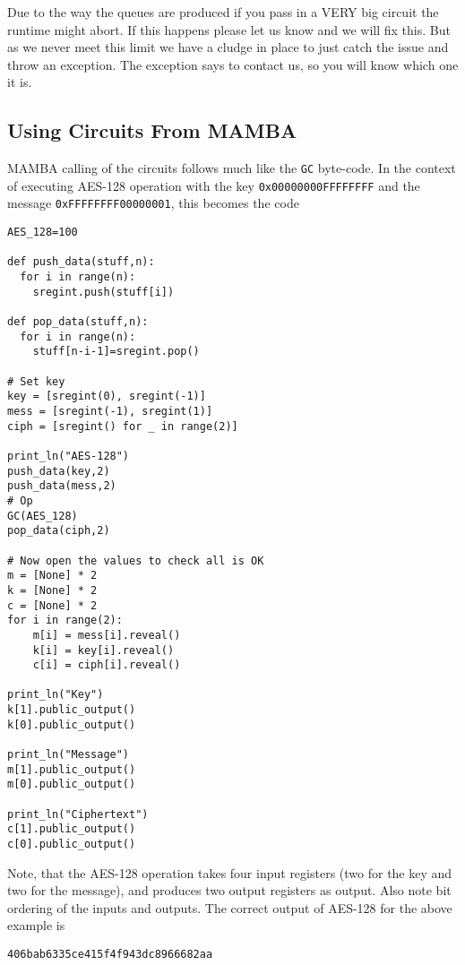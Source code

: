 Due to the way the queues are produced if you pass in a
VERY big circuit the  runtime might abort. If this happens
please let us know and we will fix this. But as we never
meet this limit we have a cludge in place to just catch
the issue and throw an exception. The exception says
to contact us, so you will know which one it is.

\subsection{Using Circuits From MAMBA}
MAMBA calling of the circuits follows much like the
\verb|GC| byte-code.
In the context of executing AES-128 operation with
the key \verb+0x00000000FFFFFFFF+ and the message
\verb+0xFFFFFFFF00000001+, this becomes the code
\begin{lstlisting}
AES_128=100

def push_data(stuff,n):
  for i in range(n):
    sregint.push(stuff[i])

def pop_data(stuff,n):
  for i in range(n):
    stuff[n-i-1]=sregint.pop()

# Set key
key = [sregint(0), sregint(-1)]
mess = [sregint(-1), sregint(1)]
ciph = [sregint() for _ in range(2)]

print_ln("AES-128")
push_data(key,2)
push_data(mess,2)
# Op
GC(AES_128)
pop_data(ciph,2)

# Now open the values to check all is OK
m = [None] * 2
k = [None] * 2
c = [None] * 2
for i in range(2):
	m[i] = mess[i].reveal()
	k[i] = key[i].reveal()
	c[i] = ciph[i].reveal()

print_ln("Key")
k[1].public_output()     
k[0].public_output()

print_ln("Message")
m[1].public_output()     
m[0].public_output()

print_ln("Ciphertext")
c[1].public_output()     
c[0].public_output()
\end{lstlisting}

Note, that the AES-128 operation takes four
input registers (two for the key and two for
the message), and produces two output registers
as output.
Also note bit ordering of the inputs and outputs.
The correct output of AES-128 for the above
example is
\begin{center}
  \verb|406bab6335ce415f4f943dc8966682aa|
\end{center}


